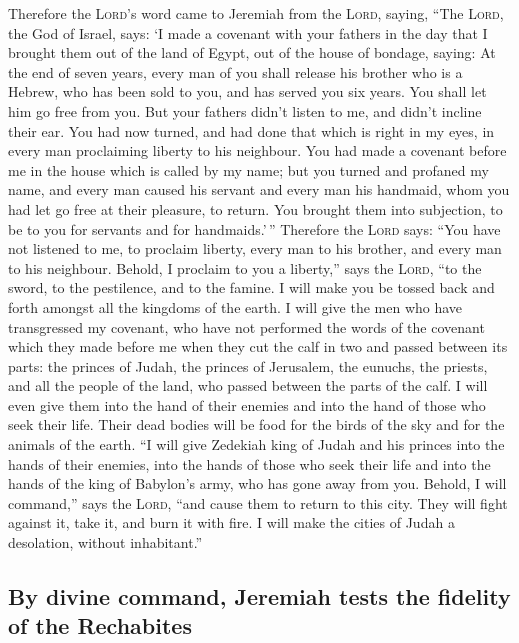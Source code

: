  Therefore the \textsc{Lord}'s word came to Jeremiah from
the \textsc{Lord}, saying,  ``The \textsc{Lord}, the God
of Israel, says: `I made a covenant with your fathers in the day that I
brought them out of the land of Egypt, out of the house of bondage,
saying:  At the end of seven years, every man of you
shall release his brother who is a Hebrew, who has been sold to you, and
has served you six years. You shall let him go free from you. But your
fathers didn't listen to me, and didn't incline their ear.
 You had now turned, and had done that which is right in
my eyes, in every man proclaiming liberty to his neighbour. You had made
a covenant before me in the house which is called by my name;
 but you turned and profaned my name, and every man
caused his servant and every man his handmaid, whom you had let go free
at their pleasure, to return. You brought them into subjection, to be to
you for servants and for handmaids.'\,''  Therefore the
\textsc{Lord} says: ``You have not listened to me, to proclaim liberty,
every man to his brother, and every man to his neighbour. Behold, I
proclaim to you a liberty,'' says the \textsc{Lord}, ``to the sword, to
the pestilence, and to the famine. I will make you be tossed back and
forth amongst all the kingdoms of the earth.  I will give
the men who have transgressed my covenant, who have not performed the
words of the covenant which they made before me when they cut the calf
in two and passed between its parts:  the princes of
Judah, the princes of Jerusalem, the eunuchs, the priests, and all the
people of the land, who passed between the parts of the calf.
 I will even give them into the hand of their enemies and
into the hand of those who seek their life. Their dead bodies will be
food for the birds of the sky and for the animals of the earth.
 ``I will give Zedekiah king of Judah and his princes
into the hands of their enemies, into the hands of those who seek their
life and into the hands of the king of Babylon's army, who has gone away
from you.  Behold, I will command,'' says the
\textsc{Lord}, ``and cause them to return to this city. They will fight
against it, take it, and burn it with fire. I will make the cities of
Judah a desolation, without inhabitant.''

\hypertarget{by-divine-command-jeremiah-tests-the-fidelity-of-the-rechabites}{%
\subsection{By divine command, Jeremiah tests the fidelity of the
Rechabites}\label{by-divine-command-jeremiah-tests-the-fidelity-of-the-rechabites}}

